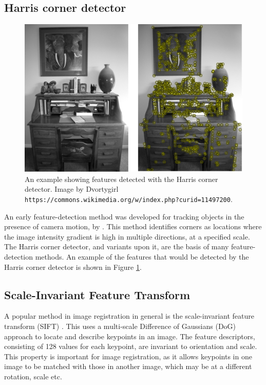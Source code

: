 \documentclass{report}
\begin{document}
\subsection{Harris corner detector}
\begin{figure}
\centering
\includegraphics[width = 5.5 in]{Writing_Desk_with_Harris_Detector.pdf}
\caption{An example showing features detected with the Harris corner detector. Image by  Dvortygirl \texttt{https://commons.wikimedia.org/w/index.php?curid=11497200}.}
\label{fig:harris_features}
\end{figure}
An early feature-detection method was developed for tracking objects in the presence of camera motion, by \cite{harris1988combined}. This method identifies corners as locations where the image intensity gradient is high in multiple directions, at a specified scale. The Harris corner detector, and variants upon it, are the basis of many feature-detection methods. An example of the features that would be detected by the Harris corner detector is shown in Figure \ref{fig:harris_features}.

\subsection{Scale-Invariant Feature Transform}
A popular method in image registration in general is the scale-invariant feature transform (SIFT) \citep{lowe2004distinctive}. This uses a multi-scale Difference of Gaussians (DoG) approach to locate and describe keypoints in an image.
The feature descriptors, consisting of 128 values for each keypoint, are invariant to orientation and scale. This property is important for image registration, as it allows keypoints in one image to be matched with those in another image, which may be at a different rotation, scale etc. 
\end{document}
